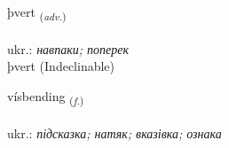 \documentclass[frontgrid, backgrid]{flacards}\usepackage[]{graphicx}\usepackage[]{xcolor}
\begin{document}

\renewcommand{\flhead}{\vskip5pt \fboxsep=0pt {\small\bfseries\footnotesize Atviksorð | прислівник}}
\renewcommand{\fcfoot}{\vskip5pt \fboxsep=0pt \hspace{2pt}{\small\bfseries\footnotesize 2K}}

\renewcommand{\blhead}{\vskip5pt {\small\bfseries\footnotesize Atviksorð | прислівник }}
\renewcommand{\bcfoot}{\vskip5pt \hspace{2pt}{\small\bfseries\footnotesize 2K}}


{þvert \small{\textsubscript{(\textit{adv.})}} \\[1ex]
\textphonetic{[θvɛr̥t]} \\
ukr.: \emph{навпаки; поперек} \\  [2ex]
þvert (Indeclinable)}

\renewcommand{\flhead}{\vskip5pt \fboxsep=0pt {\small\bfseries\footnotesize Nafnorð | іменник}}
\renewcommand{\fcfoot}{\vskip5pt \fboxsep=0pt \hspace{2pt}{\small\bfseries\footnotesize 2K}}

\renewcommand{\blhead}{\vskip5pt {\small\bfseries\footnotesize Nafnorð | іменник }}
\renewcommand{\bcfoot}{\vskip5pt \hspace{2pt}{\small\bfseries\footnotesize 2K}}


{vísbending \small{\textsubscript{(\textit{f.})}} \\[1ex] %
\textphonetic{[vispɛntiŋk]} \\
ukr.: \emph{підсказка; натяк; вказівка; ознака} \\  [2ex]
\renewcommand*{\arraystretch}{0.8}
}

\renewcommand{\flhead}{\vskip5pt \fboxsep=0pt {\small\bfseries\footnotesize Lýsingarorð | прикметник}}
\renewcommand{\fcfoot}{\vskip5pt \fboxsep=0pt \hspace{2pt}{\small\bfseries\footnotesize 2K}}
\end{document}
